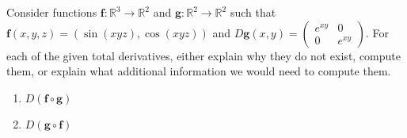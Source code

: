 \begin{problem}
Consider functions $\mathbf{f}:\mathbb{R}^3\rightarrow\mathbb{R}^2$ and $\mathbf{g}:\mathbb{R}^2\rightarrow\mathbb{R}^2$ such that $\mathbf{f}(x,y,z) = (\sin(xyz),\cos(xyz))$ and $D\mathbf{g}(x,y) = \left(\begin{array}{ccc}e^{xy}&0\\0&e^{xy}\end{array}\right)$. For each of the given total derivatives, either explain why they do not exist, compute them, or explain what additional information we would need to compute them.
\begin{enumerate}
\item $D(\mathbf{f}\circ\mathbf{g})$
\item $D(\mathbf{g}\circ\mathbf{f})$
\end{enumerate}
\end{problem}